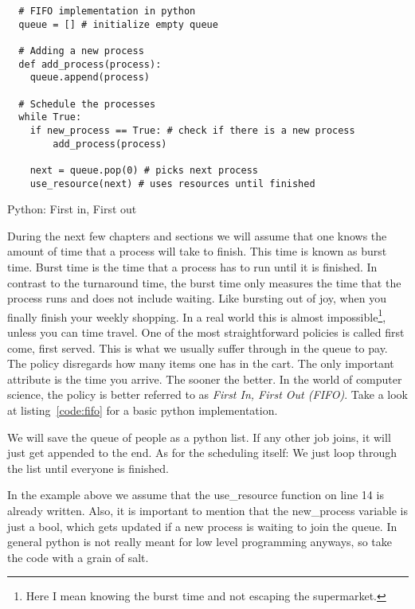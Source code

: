 \begin{listing}[h]
\begin{verbatim}
  # FIFO implementation in python
  queue = [] # initialize empty queue

  # Adding a new process
  def add_process(process):
    queue.append(process)

  # Schedule the processes
  while True:
    if new_process == True: # check if there is a new process
        add_process(process)

    next = queue.pop(0) # picks next process
    use_resource(next) # uses resources until finished
\end{verbatim}
\caption{Python: First in, First out}
\label{code:fifo}
\end{listing}

During the next few chapters and sections we will assume that one knows the amount of time that a process will take to finish.
This time is known as burst time.
Burst time is the time that a process has to run until it is finished.
In contrast to the turnaround time, the burst time only measures the time that the process runs and does not include waiting.
Like bursting out of joy, when you finally finish your weekly shopping.
In a real world this is almost impossible\footnote{Here I mean knowing the burst time and not escaping the supermarket.}, unless you can time travel.
One of the most straightforward policies is called first come, first served.
This is what we usually suffer through in the queue to pay.
The policy disregards how many items one has in the cart.
The only important attribute is the time you arrive.
The sooner the better.
In the world of computer science, the policy is better referred to as \emph{First In, First Out (FIFO)}.
Take a look at listing~\ref{code:fifo} for a basic python implementation.

We will save the queue of people as a python list.
If any other job joins, it will just get appended to the end.
As for the scheduling itself:
We just loop through the list until everyone is finished.


In the example above we assume that the use\_resource function on line 14 is already written.
Also, it is important to mention that the new\_process variable is just a bool, which gets updated if a new process is waiting to join the queue.
In general python is not really meant for low level programming anyways, so take the code with a grain of salt.


